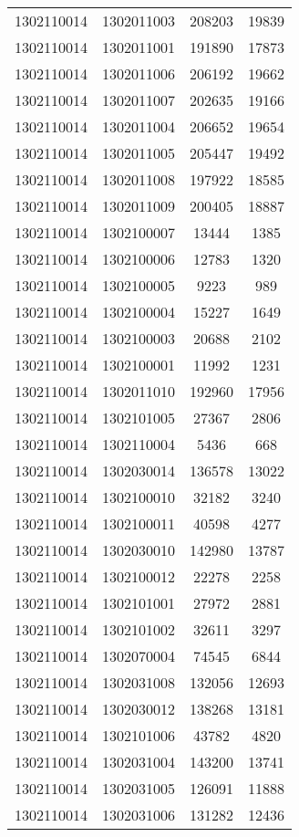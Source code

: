 \begin{longtable}[h]{llcc}
		1302110014 & 1302011003 & 208203 & 19839\\
		1302110014 & 1302011001 & 191890 & 17873\\
		1302110014 & 1302011006 & 206192 & 19662\\
		1302110014 & 1302011007 & 202635 & 19166\\
		1302110014 & 1302011004 & 206652 & 19654\\
		1302110014 & 1302011005 & 205447 & 19492\\
		1302110014 & 1302011008 & 197922 & 18585\\
		1302110014 & 1302011009 & 200405 & 18887\\
		1302110014 & 1302100007 & 13444 & 1385\\
		1302110014 & 1302100006 & 12783 & 1320\\
		1302110014 & 1302100005 & 9223 & 989\\
		1302110014 & 1302100004 & 15227 & 1649\\
		1302110014 & 1302100003 & 20688 & 2102\\
		1302110014 & 1302100001 & 11992 & 1231\\
		1302110014 & 1302011010 & 192960 & 17956\\
		1302110014 & 1302101005 & 27367 & 2806\\
		1302110014 & 1302110004 & 5436 & 668\\
		1302110014 & 1302030014 & 136578 & 13022\\
		1302110014 & 1302100010 & 32182 & 3240\\
		1302110014 & 1302100011 & 40598 & 4277\\
		1302110014 & 1302030010 & 142980 & 13787\\
		1302110014 & 1302100012 & 22278 & 2258\\
		1302110014 & 1302101001 & 27972 & 2881\\
		1302110014 & 1302101002 & 32611 & 3297\\
		1302110014 & 1302070004 & 74545 & 6844\\
		1302110014 & 1302031008 & 132056 & 12693\\
		1302110014 & 1302030012 & 138268 & 13181\\
		1302110014 & 1302101006 & 43782 & 4820\\
		1302110014 & 1302031004 & 143200 & 13741\\
		1302110014 & 1302031005 & 126091 & 11888\\
		1302110014 & 1302031006 & 131282 & 12436\\

\end{longtable}
